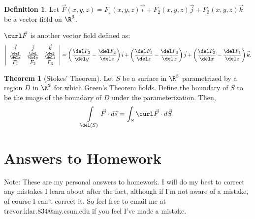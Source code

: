 \documentclass[a5paper]{article}
\theoremstyle{definition}%
\newtheorem*{theorem*}{Theorem} %
\newtheorem*{definition*}{Definition}
\numberwithin{exercise}{section}
\theoremstyle{remark}%
\begin{document}
\begin{highlight}
\begin{definition*}
Let $\vec{F}(x,y,z)=F_1(x,y,z)\vec{i}+F_2(x,y,z)\vec{j}+F_3(x,y,z)\vec{k}$ be a vector field on $\R^3$.

\mbox{}

\noindent $\curl\vec{F}$ is another vector field defined as:
\[
\left|
\begin{array}{ccc}
\vec{i}&\vec{j}&\vec{k}\\
\frac{\del}{\del x}& \frac{\del}{\del y}&\frac{\del}{\del z}\\
F_1&F_2&F_3\\
\end{array}
\right|
=\left(\frac{\del F_3}{\del y}-\frac{\del F_2}{\del z}\right)\vec{i}+\left(\frac{\del F_1}{\del z}-\frac{\del F_3}{\del x}\right)\vec{j}+\left(\frac{\del F_2}{\del x}-\frac{\del F_1}{\del z}\right)\vec{k}.
\]
\end{definition*}
\end{highlight}

\pagebreak
\begin{highlight}
\begin{theorem*}[Stokes' Theorem]
Let $S$ be a surface in $\R^3$ parametrized by a region $D$ in $\R^2$ for which Green's Theorem holds. Define the boundary of $S$ to be the image of the boundary of $D$ under the parameterization. Then, 
$$\int\limits_{\del(S)}\vec{F}\cdot d\vec{s}=\int_S \curl\vec{F}\cdot d \vec{S}.$$
\end{theorem*}
\end{highlight}


\pagebreak
\section{Answers to Homework}
Note: These are my personal answers to homework. I will do my best to correct any mistakes I learn about after the fact, although if I'm not aware of a mistake, of course I can't correct it. So feel free to email me at trevor.klar.834@my.csun.edu if you feel I've made a mistake. 
\end{document}
